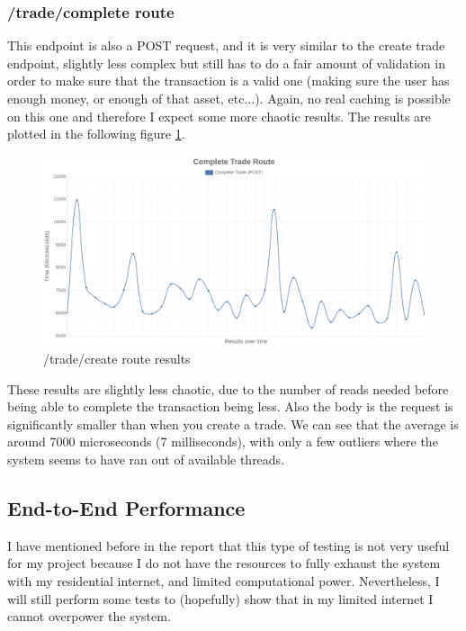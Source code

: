 \documentclass[titlepage]{article}
\begin{document}
\pagebreak
\subsubsection{/trade/complete route}
This endpoint is also a POST request, and it is very similar to the create trade endpoint, slightly less complex but still has to do a fair amount of validation in order to make sure that the transaction is a valid one (making sure the user has enough money, or enough of that asset, etc...). Again, no real caching is possible on this one and therefore I expect some more chaotic results. The results are plotted in the following figure \ref{create-trade-test}.

\begin{figure}[h!]
\includegraphics[width=\textwidth]{../results/complete-trade.png}
  \caption{/trade/create route results}
  \label{create-trade-test}
\end{figure}

These results are slightly less chaotic, due to the number of reads needed before being able to complete the transaction being less. Also the body is the request is significantly smaller than when you create a trade. We can see that the average is around 7000 microseconds (7 milliseconds), with only a few outliers where the system seems to have ran out of available threads. 

\subsection{End-to-End Performance}
I have mentioned before in the report that this type of testing is not very useful for my project because I do not have the resources to fully exhaust the system with my residential internet, and limited computational power. Nevertheless, I will still perform some tests to (hopefully) show that in my limited internet I cannot overpower the system. \\
\end{document}
